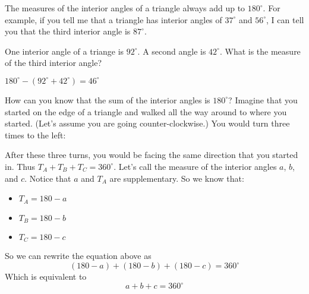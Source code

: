 The measures of the interior angles of a triangle always add up to
$180^\circ$. For example, if you tell me that a triangle has interior
angles of $37^\circ$ and $56^\circ$, I can tell you that the third
interior angle is $87^\circ$.

\begin{Exercise}[title={Missing Angle}, label=missing_angle]
One interior angle of a triange is $92^\circ$. A second angle is $42^\circ$. What is the measure of the third interior angle?
\end{Exercise}
\begin{Answer}[ref=missing_angle]
$180^\circ - (92^\circ + 42^\circ) = 46^\circ$
\end{Answer}


How can you know that the sum of the interior angles is $180^\circ$?
Imagine that you started on the edge of a triangle and walked all the
way around to where you started. (Let's assume you are going
counter-clockwise.) You would turn three times to the left:


After these three turns, you would be facing the same direction that
you started in. Thus $T_A + T_B + T_C = 360^\circ$. Let's call the
measure of the interior angles $a$, $b$, and $c$.  Notice that $a$ and
$T_A$ are supplementary. So we know that:
\begin{itemize}
\item $T_A = 180 - a$
\item $T_B = 180 - b$
\item $T_C = 180 - c$
\end{itemize}
So we can rewrite the equation above as
\begin{equation*}
  (180 - a) + (180 - b) + (180 - c) = 360^\circ
\end{equation*}
Which is equivalent to
\begin{equation*}
  a + b + c = 360^\circ
\end{equation*}

